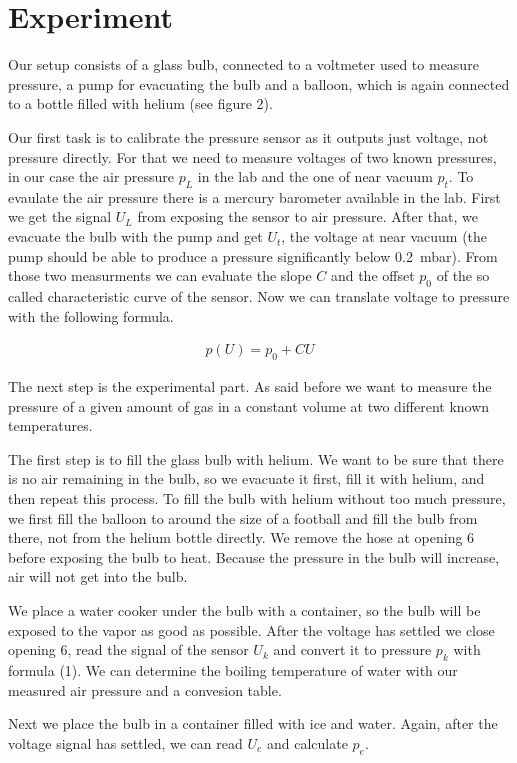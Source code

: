 \section{Experiment}
Our setup consists of a glass bulb, connected to a voltmeter used to measure pressure, a pump for evacuating the bulb and a balloon, which is again connected to a bottle filled with helium (see figure 2). 

Our first task is to calibrate the pressure sensor as it outputs just voltage, not pressure directly. For that we need to measure voltages of two known pressures, in our case the air pressure $p_L$ in the lab and the one of near vacuum $p_t$. To evaulate the air pressure there is a mercury barometer available in the lab. First we get the signal $U_L$ from exposing the sensor to air pressure. After that, we evacuate the bulb with the pump and get $U_t$, the voltage at near vacuum (the pump should be able to produce a pressure significantly below \SI{0.2}{\milli\bar}). From those two measurments we can evaluate the slope $C$ and the offset $p_0$ of the so called characteristic curve of the sensor. Now we can translate voltage to pressure with the following formula.

\begin{align}
	p(U) = p_0 + CU
\end{align}


The next step is the experimental part. As said before we want to measure the pressure of a given amount of gas in a constant volume at two different known temperatures. 

The first step is to fill the glass bulb with helium. We want to be sure that there is no air remaining in the bulb, so we evacuate it first, fill it with helium, and then repeat this process. To fill the bulb with helium without too much pressure, we first fill the balloon to around the size of a football and fill the bulb from there, not from the helium bottle directly. We remove the hose at opening 6 before exposing the bulb to heat. Because the pressure in the bulb will increase, air will not get into the bulb. 

We place a water cooker under the bulb with a container, so the bulb will be exposed to the vapor as good as possible. After the voltage has settled we close opening 6, read the signal of the sensor $U_k$ and convert it to pressure $p_k$ with formula (1). We can determine the boiling temperature of water with our measured air pressure and a convesion table. 

Next we place the bulb in a container filled with ice and water. Again, after the voltage signal has settled, we can read $U_e$ and calculate $p_e$.

